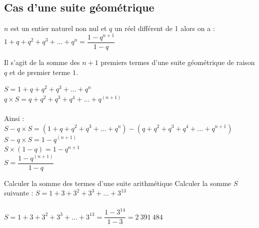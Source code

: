 \subsection{Cas d'une suite géométrique}

\begin{propriete}
    $n$ est un entier naturel non nul et $q$ un réel différent de 1 alors on a :\\ 
    $1+q+q^2+q^3+...+q^n= \dfrac{1-q^{n+1}}{1-q}$
\end{propriete}

\begin{remarque}
    Il s'agit de la somme des $n+1$ premiers termes d'une suite géométrique de raison $q$ et de premier terme $1$.
\end{remarque}

\begin{demonstration}
    $S=1+q+q^2+q^3+...+q^n$\\
    $q\times S=q+q^2+q^3+q^4+...+q^(n+1)$\\
    \\
    Ainsi :\\
    $S-q\times S=(1+q+q^2+q^3+...+q^n )-(q+q^2+q^3+q^4+...+q^{n+1})$\\
    $S-q\times S=1-q^(n+1)$\\
    $S\times (1-q)=1-q^{n+1}$\\
    $S=\dfrac{1-q^(n+1)}{1-q}$
\end{demonstration}

\begin{methodeTitre}{Calculer la somme des termes d'une suite arithmétique}
Calculer la somme $S$ suivante : 
$S=1+3+3^2+3^3+...+3^{13}$\\
\\
$S=1+3+3^2+3^3+...+3^{13}=\dfrac{1-3^{14}}{1-3}=2\  391\  484$

\end{methodeTitre}


